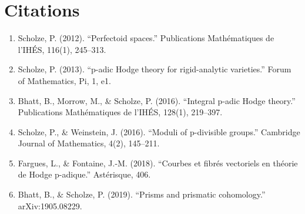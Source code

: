 \section{Citations}

\begin{enumerate}
\item Scholze, P. (2012). ``Perfectoid spaces.'' Publications Mathématiques de l'IHÉS, 116(1), 245--313.
\item Scholze, P. (2013). ``p-adic Hodge theory for rigid-analytic varieties.'' Forum of Mathematics, Pi, 1, e1.
\item Bhatt, B., Morrow, M., \& Scholze, P. (2016). ``Integral p-adic Hodge theory.'' Publications Mathématiques de l'IHÉS, 128(1), 219--397.
\item Scholze, P., \& Weinstein, J. (2016). ``Moduli of p-divisible groups.'' Cambridge Journal of Mathematics, 4(2), 145--211.
\item Fargues, L., \& Fontaine, J.-M. (2018). ``Courbes et fibrés vectoriels en théorie de Hodge p-adique.'' Astérisque, 406.
\item Bhatt, B., \& Scholze, P. (2019). ``Prisms and prismatic cohomology.'' arXiv:1905.08229.
\end{enumerate}
